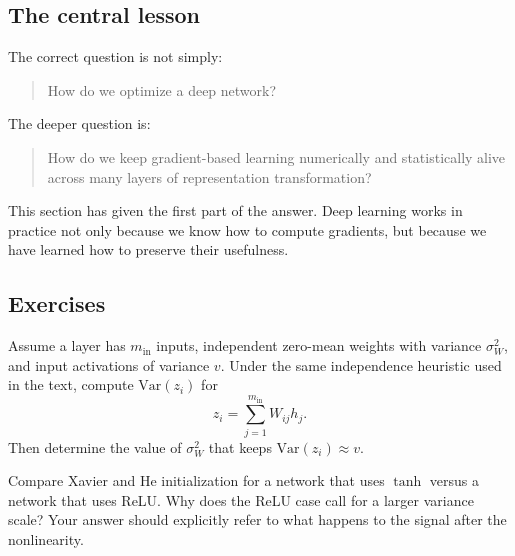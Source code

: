 \subsection*{The central lesson}

The correct question is not simply:
\begin{quote}
How do we optimize a deep network?
\end{quote}
The deeper question is:
\begin{quote}
How do we keep gradient-based learning numerically and statistically alive across many layers of representation transformation?
\end{quote}

\medskip

This section has given the first part of the answer.
Deep learning works in practice not only because we know how to compute gradients, but because we have learned how to preserve their usefulness.


\subsection*{Exercises}

\begin{exercise}
Assume a layer has $m_{\mathrm{in}}$ inputs, independent zero-mean weights with variance $\sigma_W^2$, and input activations of variance $v$.
Under the same independence heuristic used in the text, compute $\mathrm{Var}(z_i)$ for
\[
z_i=\sum_{j=1}^{m_{\mathrm{in}}}W_{ij}h_j.
\]
Then determine the value of $\sigma_W^2$ that keeps $\mathrm{Var}(z_i)\approx v$.
\end{exercise}

\begin{exercise}
Compare Xavier and He initialization for a network that uses $\tanh$ versus a network that uses ReLU.
Why does the ReLU case call for a larger variance scale?
Your answer should explicitly refer to what happens to the signal after the nonlinearity.
\end{exercise}

